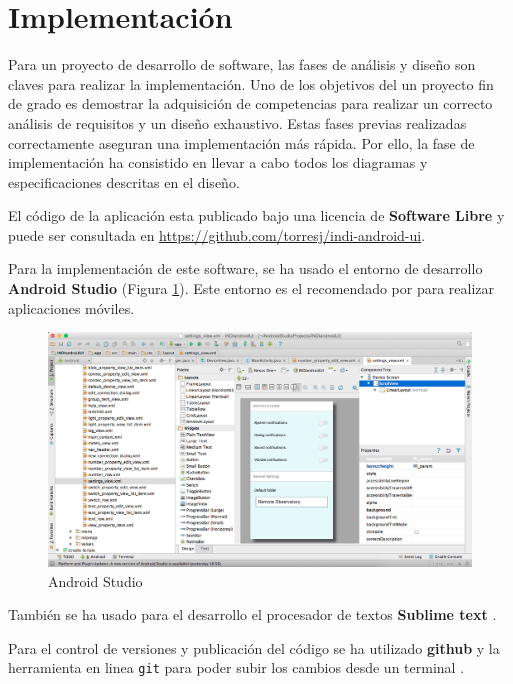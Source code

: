 \bigskip
\section{Implementación}

Para un proyecto de desarrollo de software, las fases de análisis y diseño son claves para realizar la implementación. Uno de los objetivos del un proyecto fin de grado es demostrar la adquisición de competencias para realizar un correcto análisis de requisitos y un diseño exhaustivo. Estas fases previas realizadas correctamente aseguran una implementación más rápida. Por ello, la fase de implementación ha consistido en llevar a cabo todos los diagramas y especificaciones descritas en el diseño.

\bigskip
El código de la aplicación esta publicado bajo una licencia de \textbf{Software Libre} y puede ser consultada en \url{https://github.com/torresj/indi-android-ui}.

\bigskip
Para la implementación de este software, se ha usado el entorno de desarrollo \textbf{Android Studio} \cite{AS} (Figura \ref{fig:android_studio}). Este entorno es el recomendado por  para realizar aplicaciones móviles.

\begin{figure}[!ht]
  \begin{center}
    \includegraphics[width=1\textwidth]{../images/android_studio.png}
    \caption{Android Studio}
    \label{fig:android_studio}
  \end{center}
\end{figure}

\bigskip
También se ha usado para el desarrollo el procesador de textos \textbf{Sublime text} \cite{ST2}.

\bigskip
Para el control de versiones y publicación del código se ha utilizado \textbf{github} y la herramienta en linea \texttt{git} para poder subir los cambios desde un terminal \cite{GH}.